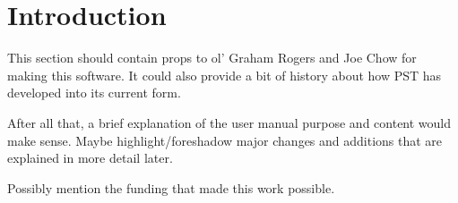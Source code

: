 \vspace{2em} %
\chapter*{Introduction}

This section should contain props to ol' Graham Rogers and Joe Chow for making this software.
It could also provide a bit of history about how PST has developed into its current form.

After all that, a brief explanation of the user manual purpose and content would make sense.
Maybe highlight/foreshadow major changes and additions that are explained in more detail later.

Possibly mention the funding that made this work possible.